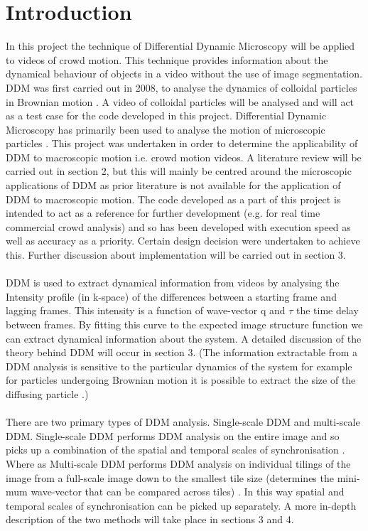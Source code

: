 \documentclass[11pt]{article}
\begin{document}
\section{Introduction}
In this project the technique of Differential Dynamic Microscopy will be applied to videos of crowd motion. This technique provides information about the dynamical behaviour of objects in a video without the use of image segmentation. DDM was first carried out in 2008, to analyse the dynamics of colloidal particles in Brownian motion \cite{ddm0}. A video of colloidal particles will be analysed and will act as a test case for the code developed in this project. Differential Dynamic Microscopy has primarily been used to analyse the motion of microscopic particles \cite{ddm1} \cite{ddm2}. This project was undertaken in order to determine the applicability of DDM to macroscopic motion i.e. crowd motion videos. A literature review will be carried out in section 2, but this will mainly be centred around the microscopic applications of DDM as prior literature is not available for the application of DDM to macroscopic motion. The code developed as a part of this project is intended to act as a reference for further development (e.g. for real time commercial crowd analysis) and so has been developed with execution speed as well as accuracy as a priority. Certain design decision were undertaken to achieve this. Further discussion about implementation will be carried out in section 3.
\\\\
DDM is used to extract dynamical information from videos by analysing the Intensity profile (in k-space) of the differences between a starting frame and lagging frames. This intensity is a function of wave-vector q and $\tau$ the time delay between frames. By fitting this curve to the expected image structure function we can extract dynamical information about the system. A detailed discussion of the theory behind DDM will occur in section 3. (The information extractable from a DDM analysis is sensitive to the particular dynamics of the system for example for particles undergoing Brownian motion it is possible to extract the size of the diffusing particle \cite{ddm1}.)
\\\\
There are two primary types of DDM analysis. Single-scale DDM and multi-scale DDM. Single-scale DDM performs DDM analysis on the entire image and so picks up a combination of the spatial and temporal scales of synchronisation \cite{ddm2}. Where as Multi-scale DDM performs DDM analysis on individual tilings of the image from a full-scale image down to the smallest tile size (determines the mini-mum wave-vector that can be compared across tiles) \cite{ddm2}. In this way spatial and temporal scales of synchronisation can be picked up separately. A more in-depth description of the two methods will take place in sections 3 and 4.  
\end{document}
